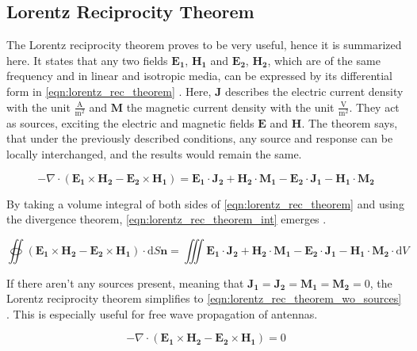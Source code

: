\subsection{Lorentz Reciprocity Theorem}

The Lorentz reciprocity theorem proves to be very useful, hence it is summarized here. It states that any two fields $\mathbf{E_1}$, $\mathbf{H_1}$ and $\mathbf{E_2}$, $\mathbf{H_2}$, which are of the same frequency and in linear and isotropic media, can be expressed by its differential form in \autoref{eqn:lorentz_rec_theorem} \cite{Balanis_1997,Collin_2015}. Here, $\mathbf{J}$ describes the electric current density with the unit $\frac{\mathrm{A}}{\mathrm{m^2}}$ and $\mathbf{M}$ the magnetic current density with the unit $\frac{\mathrm{V}}{\mathrm{m^2}}$. They act as sources, exciting the electric and magnetic fields $\mathbf{E}$ and $\mathbf{H}$. The theorem says, that under the previously described conditions, any source and response can be locally interchanged, and the results would remain the same.

\begin{equation}
    -\nabla \cdot (\mathbf{E_1}\times \mathbf{H_2}-\mathbf{E_2}\times \mathbf{H_1})=\mathbf{E_1}\cdot \mathbf{J_2}+\mathbf{H_2}\cdot \mathbf{M_1}-\mathbf{E_2}\cdot \mathbf{J_1}-\mathbf{H_1}\cdot \mathbf{M_2}
    \label{eqn:lorentz_rec_theorem}
\end{equation}

By taking a volume integral of both sides of \autoref{eqn:lorentz_rec_theorem} and using the divergence theorem, \autoref{eqn:lorentz_rec_theorem_int} emerges \cite{Balanis_1997,Collin_2015}.

\begin{equation}
    \oiint (\mathbf{E_1}\times \mathbf{H_2}-\mathbf{E_2}\times \mathbf{H_1})\cdot \mathrm{d}S\mathbf{n}=\iiint
\mathbf{E_1}\cdot \mathbf{J_2}+\mathbf{H_2}\cdot \mathbf{M_1}-\mathbf{E_2}\cdot \mathbf{J_1}-\mathbf{H_1}\cdot \mathbf{M_2}\cdot \mathrm{d}V
    \label{eqn:lorentz_rec_theorem_int}
\end{equation}

If there aren't any sources present, meaning that $\mathbf{J_1}=\mathbf{J_2}=\mathbf{M_1}=\mathbf{M_2}=0$, the Lorentz reciprocity theorem simplifies to \autoref{eqn:lorentz_rec_theorem_wo_sources} \cite{Balanis_1997,Lorrain_Corson_1970}. This is especially useful for free wave propagation of antennas.

\begin{equation}
    -\nabla \cdot (\mathbf{E_1}\times \mathbf{H_2}-\mathbf{E_2}\times \mathbf{H_1})=0
    \label{eqn:lorentz_rec_theorem_wo_sources}
\end{equation}

